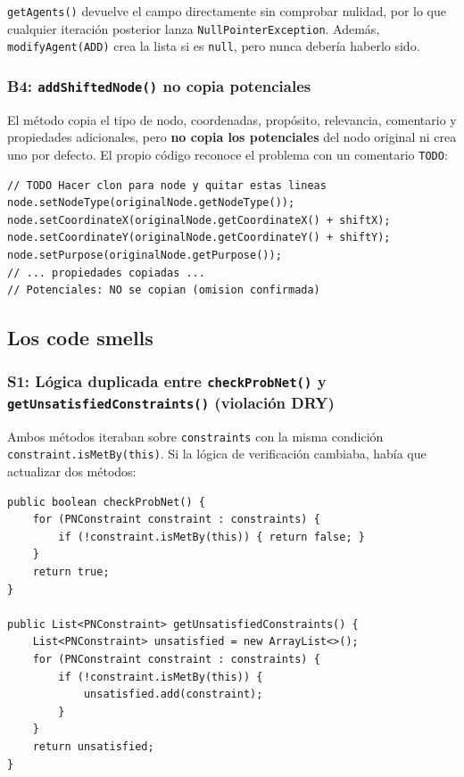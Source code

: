 \documentclass[11pt,a4paper]{article}
\newcommand{\code}[1]{\texttt{#1}}
\begin{document}
\code{getAgents()} devuelve el campo directamente sin comprobar nulidad,
por lo que cualquier iteración posterior lanza \code{NullPointerException}.
Además, \code{modifyAgent(ADD)} crea la lista si es \code{null}, pero
nunca debería haberlo sido.

\subsubsection{B4: \texttt{addShiftedNode()} no copia potenciales}

El método copia el tipo de nodo, coordenadas, propósito, relevancia,
comentario y propiedades adicionales, pero \textbf{no copia los
potenciales} del nodo original ni crea uno por defecto.  El propio
código reconoce el problema con un comentario \code{TODO}:

\begin{lstlisting}[caption={B4: potenciales no copiados; el TODO reconoce la deuda.},
                   label=lst:b4]
// TODO Hacer clon para node y quitar estas lineas
node.setNodeType(originalNode.getNodeType());
node.setCoordinateX(originalNode.getCoordinateX() + shiftX);
node.setCoordinateY(originalNode.getCoordinateY() + shiftY);
node.setPurpose(originalNode.getPurpose());
// ... propiedades copiadas ...
// Potenciales: NO se copian (omision confirmada)
\end{lstlisting}

\subsection{Los code smells}
\label{sec:smells}

\subsubsection{S1: Lógica duplicada entre \texttt{checkProbNet()} y
                   \texttt{getUnsatisfiedConstraints()} (violación DRY)}

Ambos métodos iteraban sobre \code{constraints} con la misma condición
\code{constraint.isMetBy(this)}.  Si la lógica de verificación cambiaba,
había que actualizar dos métodos:

\begin{lstlisting}[caption={S1: el mismo bucle aparece en dos métodos (violación DRY).},
                   label=lst:s1-antes]
public boolean checkProbNet() {
    for (PNConstraint constraint : constraints) {
        if (!constraint.isMetBy(this)) { return false; }
    }
    return true;
}

public List<PNConstraint> getUnsatisfiedConstraints() {
    List<PNConstraint> unsatisfied = new ArrayList<>();
    for (PNConstraint constraint : constraints) {
        if (!constraint.isMetBy(this)) {
            unsatisfied.add(constraint);
        }
    }
    return unsatisfied;
}
\end{lstlisting}
\end{document}
